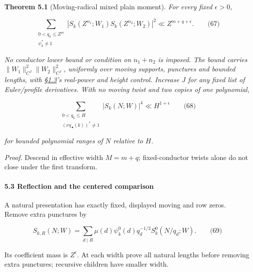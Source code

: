\textbf{Theorem 5.1} (Moving-radical mixed plain moment). \emph{\hypertarget{cf:mixed-plain-moment}{}\label{cf:mixed-plain-moment} For every fixed \(\epsilon>0\),}

\hypertarget{cf:eq:D.3}{}

\label{cf:eq:D.3}

\[
\sum_{\substack{0<q_k\le Z^m\\\psi_k^*\ne1}}
 |S_k(Z^{n_1};W_1)S_k(Z^{n_2};W_2)|^2
\ll Z^{m+q+\epsilon}.
\qquad\text{(67)}
\]

\emph{No conductor lower bound or condition on \(n_1+n_2\) is imposed. The bound carries \(\|W_1\|_{C^J}^2\|W_2\|_{C^J}^2\), uniformly over moving supports, punctures and bounded lengths, with §\protect\hyperlink{cf:sec:1.2}{1.3}'s real-power and height control. Increase \(J\) for any fixed list of Euler/profile derivatives. With no moving twist and two copies of one polynomial,}

\hypertarget{cf:eq:D.4}{}

\label{cf:eq:D.4}

\[
\sum_{\substack{0<q_k\le H\\(\nu\chi_\bullet(k))^*\ne1}}
 |S_k(N;W)|^4\ll H^{1+\epsilon}
\qquad\text{(68)}
\]

\emph{for bounded polynomial ranges of \(N\) relative to \(H\).}

\emph{Proof.} Descend in effective width \(M=m+q\); fixed-conductor twists alone do not close under the first transform.

\hypertarget{cf:sec:D.3}{}

\label{cf:sec:D.3}

\hypertarget{reflection-and-the-centered-comparison}{%
\paragraph{5.3 Reflection and the centered comparison}\label{reflection-and-the-centered-comparison}}

A natural presentation has exactly fixed, displayed moving and row zeros. Remove extra punctures by

\hypertarget{cf:eq:D.5}{}

\label{cf:eq:D.5}

\[
S_{k,R}(N;W)=\sum_{d\mid R}\mu(d)\psi_k^0(d)q_d^{-1/2}S_k^0(N/q_d;W).
\qquad\text{(69)}
\]

Its coefficient mass is \(Z^\epsilon\). At each width prove all natural lengths before removing extra punctures; recursive children have smaller width.


